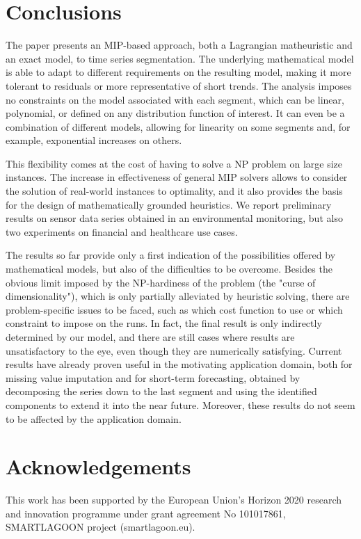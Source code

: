 \documentclass[runningheads]{llncs}
\begin{document}
\vspace{-0.5cm}
\section{Conclusions} \label{sec:conclusions}

The paper presents an MIP-based approach, both a Lagrangian matheuristic and an exact model, to time series segmentation. The underlying mathematical model is able to adapt to different requirements on the resulting model, making it more tolerant to residuals or more representative of short trends. 
The analysis imposes no constraints on the model associated with each segment, which can be linear, polynomial, or defined on any distribution function of interest. It can even be a combination of different models, allowing for linearity on some segments and, for example, exponential increases on others.

This flexibility comes at the cost of having to solve a NP problem on large size instances. The increase in effectiveness of general MIP solvers allows to consider the solution of real-world instances to optimality, and it also provides the basis for the design of mathematically grounded heuristics. We report preliminary results on sensor data series obtained in an environmental monitoring, but also two experiments on financial and healthcare use cases.

The results so far provide only a first indication of the possibilities offered by mathematical models, but also of the difficulties to be overcome. Besides the obvious limit imposed by the NP-hardiness of the problem (the "curse of dimensionality"), which is only partially alleviated by heuristic solving, there are problem-specific issues to be faced, such as which cost function to use or which constraint to impose on the runs. In fact, the final result is only indirectly determined by our model, and there are still cases where results are unsatisfactory to the eye, even though they are numerically satisfying. 
Current results have already proven useful in the motivating application domain, both for missing value imputation and for short-term forecasting, obtained by decomposing the series down to the last segment and using the identified components to extend it into the near future. Moreover, these results do not seem to be affected by the application domain.

\section*{Acknowledgements}
This work has been supported by the European Union’s Horizon 2020 research and innovation programme under grant agreement No 101017861, SMARTLAGOON project (smartlagoon.eu).
\end{document}

